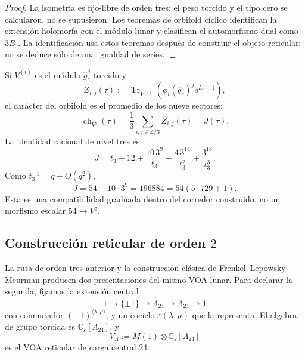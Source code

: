 \begin{proof}
La isometría es fijo-libre de orden tres; el peso torcido y el tipo cero se
calcularon, no se supusieron. Los teoremas de orbifold cíclico identifican
la extensión holomorfa con el módulo lunar y clasifican el automorfismo dual
como \(3B\)
\cite{ChenLamShimakura2016,AbeLamYamada2017,Carnahan2017}. La
identificación usa estos teoremas después de construir el objeto reticular;
no se deduce sólo de una igualdad de series.
\end{proof}

Si \(V^{(i)}\) es el módulo \(\widehat g_c^{\,i}\)-torcido y
\[
 Z_{i,j}(\tau):=
 \operatorname{Tr}_{V^{(i)}}\!
 \left(
 \phi_i(\widehat g_c)^j q^{L_0-1}
 \right),
\]
el carácter del orbifold es el promedio de los nueve sectores:
\begin{equation}
 \operatorname{ch}_{V^\natural}(\tau)
 =\frac13\sum_{i,j\in\mathbb Z/3}Z_{i,j}(\tau)
 =J(\tau).
 \label{p12-83-c20-s8:eq:promedio-nueve-sectores-u031}
\end{equation}
La identidad racional de nivel tres es
\begin{equation}
 J
 =t_3+12+\frac{10\,3^9}{t_3}
 +\frac{4\,3^{14}}{t_3^2}
 +\frac{3^{18}}{t_3^3}.
 \label{p12-83-c20-s8:eq:j-desde-t3-u031}
\end{equation}
Como \(t_3^{-1}=q+O(q^2)\),
\begin{equation}
 [q]J=54+10\cdot3^9=196884
 =54(5\cdot729+1).
 \label{p12-83-c20-s8:eq:coeficiente-196884-u031}
\end{equation}
Esta es una compatibilidad graduada dentro del corredor construido, no un
morfismo escalar \(54\to V^\natural\).

\subsection{Construcción reticular de orden \(2\)}

La ruta de orden tres anterior y la construcción clásica de
Frenkel--Lepowsky--Meurman producen dos presentaciones del mismo VOA lunar.
Para declarar la segunda, fijamos la extensión central
\begin{equation}
 1\longrightarrow\{\pm1\}
 \longrightarrow\widehat\Lambda_{24}
 \longrightarrow\Lambda_{24}
 \longrightarrow1
 \label{p12-83-c20-s8:eq:extension-central-leech-u031}
\end{equation}
con conmutador
\((-1)^{\langle\lambda,\mu\rangle}\), y un cociclo
\(\varepsilon(\lambda,\mu)\) que la representa. El álgebra de grupo
torcida es \(\mathbb C_\varepsilon[\Lambda_{24}]\), y
\begin{equation}
 V_\Lambda
 :=M(1)\otimes\mathbb C_\varepsilon[\Lambda_{24}]
 \label{p12-83-c20-s8:eq:voa-reticular-leech-u031}
\end{equation}
es el VOA reticular de carga central 24.

